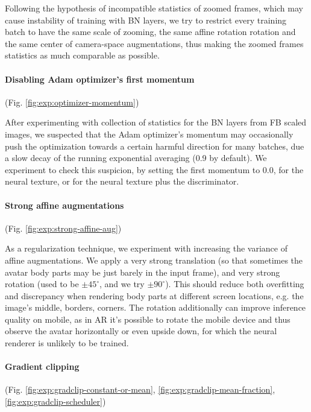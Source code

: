 Following the hypothesis of incompatible statistics of zoomed frames, which may cause instability of training with BN layers, we try to restrict every training batch to have the same scale of zooming, the same affine rotation rotation and the same center of camera-space augmentations, thus making the zoomed frames statistics as much comparable as possible.

\vspace{-15pt}\paragraph{Disabling Adam optimizer's first momentum}(Fig. \ref{fig:exp:optimizer-momentum})\mbox{}\nopagebreak

After experimenting with collection of statistics for the BN layers from FB scaled images, we suspected that the Adam optimizer's momentum may occasionally push the optimization towards a certain harmful direction for many batches, due a slow decay of the running exponential averaging (0.9 by default). We experiment to check this suspicion, by setting the first momentum to 0.0, for the neural texture, or for the neural texture plus the discriminator.

\vspace{-15pt}\paragraph{Strong affine augmentations}(Fig. \ref{fig:exp:strong-affine-aug})\mbox{}\nopagebreak

As a regularization technique, we experiment with increasing the variance of affine augmentations. We apply a very strong translation (so that sometimes the avatar body parts may be just barely in the input frame), and very strong rotation (used to be $\pm 45^\circ$, and we try $\pm 90^\circ$). This should reduce both overfitting and discrepancy when rendering body parts at different screen locations, e.g. the image's middle, borders, corners. The rotation additionally can improve inference quality on mobile, as in AR it's possible to rotate the mobile device and thus observe the avatar horizontally or even upside down, for which the neural renderer is unlikely to be trained.

\vspace{-15pt}\paragraph{Gradient clipping}(Fig. \ref{fig:exp:gradclip-constant-or-mean}, \ref{fig:exp:gradclip-mean-fraction}, \ref{fig:exp:gradclip-scheduler})\mbox{}\nopagebreak

